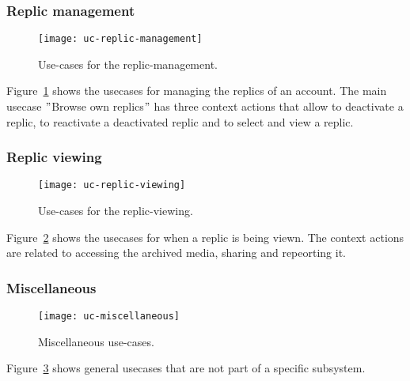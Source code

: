 \subsubsection{Replic management}
\begin{figure}
    \centering
    \texttt{[image: uc-replic-management]}
    \caption{Use-cases for the replic-management.}
    \label{fig:replic-management}
\end{figure}

Figure~\ref{fig:replic-management} shows the usecases for managing the replics of an account.
The main usecase \("\)Browse own replics\("\) has three context actions that allow to deactivate a replic, to reactivate a deactivated replic and to select and view a replic.

\subsubsection{Replic viewing}
\begin{figure}
    \centering
    \texttt{[image: uc-replic-viewing]}
    \caption{Use-cases for the replic-viewing.}
    \label{fig:replic-viewing}
\end{figure}

Figure~\ref{fig:replic-viewing} shows the usecases for when a replic is being viewn.
The context actions are related to accessing the archived media, sharing and repeorting it.

\subsubsection{Miscellaneous}
\begin{figure}
    \centering
    \texttt{[image: uc-miscellaneous]}
    \caption{Miscellaneous use-cases.}
    \label{fig:miscellaneous}
\end{figure}

Figure~\ref{fig:miscellaneous} shows general usecases that are not part of a specific subsystem.